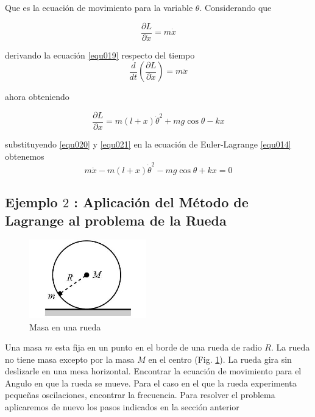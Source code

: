 \documentclass[12pt]{book}
\theoremstyle{definition}
\theoremstyle{remark}
\theoremstyle{plain}
\begin{document}
Que es la ecuación de movimiento para la variable $\theta$. Considerando que

\begin{equation}
\label{equ019}
\frac{\partial L}{\partial \dot{x}}=m \dot{x}
\end{equation}

derivando la ecuación \ref{equ019} respecto del tiempo 
\begin{equation}
\label{equ020}
\frac{d}{d t} \left ( \frac{\partial L}{\partial \dot{x}} \right )=m \ddot{x}
\end{equation}

ahora obteniendo

\begin{equation}
\label{equ021}
 \frac{\partial L}{\partial x}=m (l+x) \dot{\theta}^2+m g \cos \theta - k x
\end{equation}

 substituyendo \ref{equ020} y \ref{equ021} en la ecuación de Euler-Lagrange \ref{equ014} obtenemos
\begin{equation}
\label{equ022}
m  \ddot{x} - m (l+x) \dot{\theta}^2-m g \cos \theta + k x=0
\end{equation}

\subsection{Ejemplo $2$ : Aplicación del Método de Lagrange al problema de la Rueda }

\begin{figure}
\centering
\includegraphics[width=2in]{rueda.jpeg}
\caption{Masa en una rueda}
\label{fig101}
\end{figure}

Una masa $m$ esta fija en un punto en el borde de una rueda de radio $R$. La rueda no tiene masa excepto por la masa $M$ en el centro (Fig. \ref{fig101}). La rueda gira sin deslizarle en una mesa horizontal. Encontrar la ecuación de movimiento para el Angulo en que la rueda se mueve. Para el caso en el que la rueda experimenta pequeñas oscilaciones, encontrar la frecuencia.
Para resolver el problema aplicaremos de nuevo los pasos indicados en la sección anterior
\end{document}
